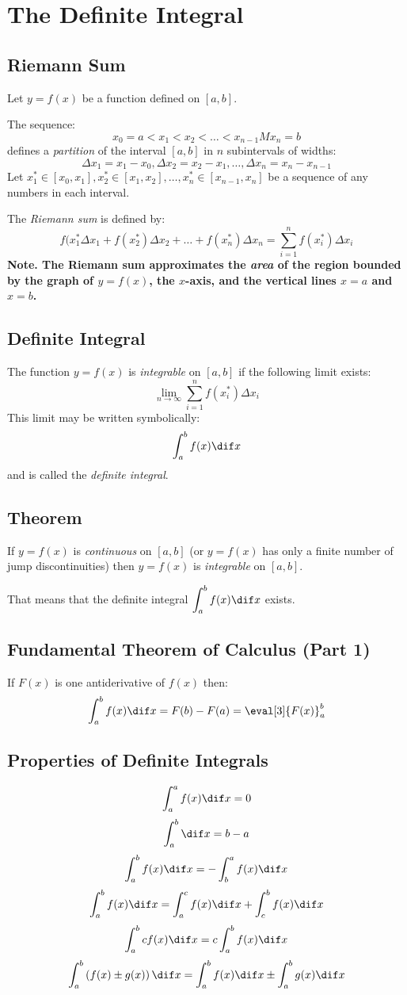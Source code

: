 \section{The Definite Integral}
\subsection{Riemann Sum}
	Let $y=f(x)$ be a function defined on $[a,b]$.

	The sequence:
	\[x_0 = a< x_1 < x_2 < \dots < x_{n-1} M x_n = b\]
	defines a \emph{partition} of the interval $[a,b]$ in $n$ subintervals of widths:
	\[\Delta x_1 = x_1-x_0, \Delta x_2 = x_2 - x_1, \dots , \Delta x_n=x_n-x_{n-1}\]
	Let $x_1^* \in [x_0,x_1], x_2^* \in [x_1,x_2], \dots , x_n^* \in [x_{n-1},x_n]$ be a sequence of any numbers in each interval.

	The \emph{Riemann sum} is defined by:
	\[f(x_1^*\Delta x_1 + f(x_2^*)\Delta x_2 + \dots + f(x_n^*)\Delta x_n = \sum_{i=1}^n f(x_i^*)\Delta x_i\]
	\textbf{Note. The Riemann sum approximates the \emph{area} of the region bounded by the graph of $y=f(x)$, the $x$-axis, and the vertical lines $x=a$ and $x=b$.}
\subsection{Definite Integral}
	The function $y=f(x)$ is \emph{integrable} on $[a,b]$ if the following limit exists:
	\[\lim_{n \to \infty} \sum_{i=1}^n f(x_i^*) \Delta x_i\]
	This limit may be written symbolically:
	\[\int_a^b f(x) \dif x\]
	and is called the \emph{definite integral}.
\subsection{Theorem}
	If $y=f(x)$ is \emph{continuous} on $[a,b]$ (or $y=f(x)$ has only a finite number of jump discontinuities) then $y=f(x)$ is \emph{integrable} on $[a,b]$.

	That means that the definite integral $\displaystyle\int_a^b f(x) \dif x$ exists.
\subsection{Fundamental Theorem of Calculus (Part 1)}
	If $F(x)$ is one antiderivative of $f(x)$ then:
	\[\int_a^b f(x) \dif x = F(b) - F(a) = \eval[3]{F(x)}_a^b\]
\subsection{Properties of Definite Integrals}
	\[\int_a^a f(x) \dif x = 0\]
	\[\int_a^b \dif x = b-a\]
	\[\int_a^b f(x) \dif x = -\int_b^a f(x) \dif x\]
	\[\int_a^b f(x) \dif x = \int_a^c f(x) \dif x + \int_c^b f(x) \dif x\]
	\[\int_a^b c f(x) \dif x = c \int_a^b f(x) \dif x\]
	\[\int_a^b \left( f(x) \pm g(x) \right) \dif x = \int_a^b f(x) \dif x \pm \int_a^b g(x) \dif x\]
